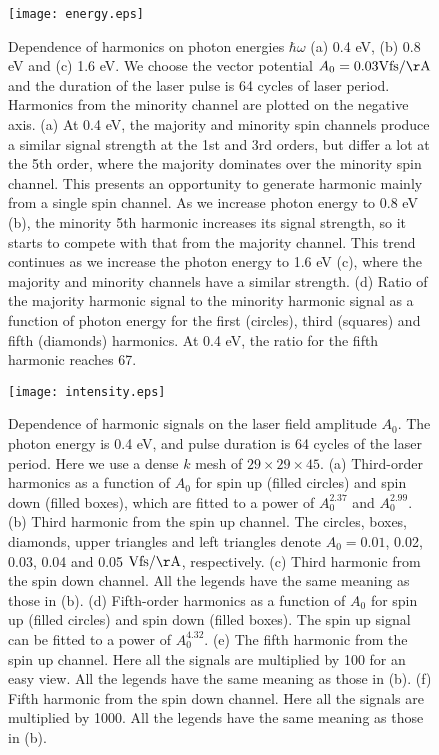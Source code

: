 \documentclass[checkin,showpacs,psfig,aps,pra]{revtex4}
\begin{document}




\begin{figure}
\texttt{[image: energy.eps]}
\caption{ Dependence of harmonics on photon energies $\hbar\omega$ (a)
  0.4 eV, (b) 0.8 eV and (c) 1.6 eV. We choose the vector potential
  $A_0=0.03 \rm Vfs/\AA$ and the duration of the laser pulse is 64
  cycles of laser period. Harmonics from the minority channel are
  plotted on the negative axis.  (a) At 0.4 eV, the majority and
  minority spin channels produce a similar signal strength at the 1st
  and 3rd orders, but differ a lot at the 5th order, where the
  majority dominates over the minority spin channel. This presents an
  opportunity to generate harmonic mainly from a single spin
  channel. As we increase photon energy to 0.8 eV (b), the minority
  5th harmonic increases its signal strength, so it starts to compete
  with that from the majority channel. This trend continues as we
  increase the photon energy to 1.6 eV (c), where the majority and
  minority channels have a similar strength.  (d) Ratio of the
  majority harmonic signal to the minority harmonic signal as a
  function of photon energy for the first (circles), third (squares)
  and fifth (diamonds) harmonics. At 0.4 eV, the ratio for the fifth
  harmonic reaches 67.  }
\label{fig2}
\end{figure}


\begin{figure}
\texttt{[image: intensity.eps]}
\caption{Dependence of harmonic signals on the laser field amplitude
  $A_0$.  The photon energy is 0.4 eV, and pulse duration is 64 cycles
  of the laser period. Here we use a dense $k$ mesh of $29\times 29
  \times 45$. {(a) Third-order harmonics as a function of $A_0$
    for spin up (filled circles) and spin down (filled boxes), which
    are fitted to a power of $A_0^{2.37}$ and $A_0^{2.99}$.  (b) Third
    harmonic from the spin up channel. The circles, boxes, diamonds,
    upper triangles and left triangles denote $A_0=0.01$, 0.02, 0.03,
    0.04 and 0.05 $\rm Vfs/\AA$, respectively.  (c) Third harmonic
    from the spin down channel. All the legends have the same meaning
    as those in (b).  (d) Fifth-order harmonics as a function of $A_0$
    for spin up (filled circles) and spin down (filled boxes). The
    spin up signal can be fitted to a power of $A_0^{4.32}$.  (e) The
    fifth harmonic from the spin up channel. Here all the signals are
    multiplied by 100 for an easy view. All the legends have the same
    meaning as those in (b).  (f) Fifth harmonic from the spin down
    channel.  Here all the signals are multiplied by 1000. All the
    legends have the same meaning as those in (b).} }
\label{fig3}
\end{figure}
\end{document}
